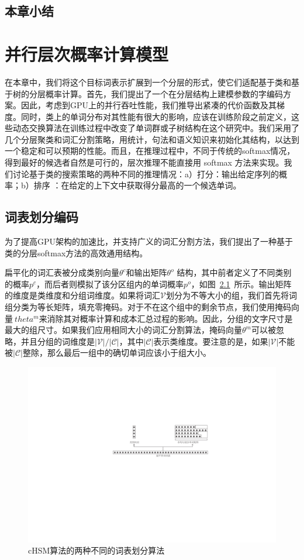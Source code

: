 \section{本章小结}

\chapter{并行层次概率计算模型}
在本章中，我们将这个目标词表示扩展到一个分层的形式，使它们适配基于类和基于树的分层概率计算。首先，我们提出了一个在分层结构上建模参数的字编码方案。因此，考虑到GPU上的并行吞吐性能，我们推导出紧凑的代价函数及其梯度。同时，类上的单词分布对其性能有很大的影响，应该在训练阶段之前定义，这些动态交换算法在训练过程中改变了单词群或子树结构在这个研究中。我们采用了几个分层聚类和词汇分割策略，用统计，句法和语义知识来初始化其结构，以达到一个稳定和可以预期的性能。而且，在推理过程中，不同于传统的softmax情况，得到最好的候选者自然是可行的，层次推理不能直接用 softmax 方法来实现。我们讨论基于类的搜索策略的两种不同的推理情况：a）打分：输出给定序列的概率；b）排序   ：在给定的上下文中获取得分最高的一个候选单词。
\section{词表划分编码}
为了提高GPU架构的加速比，并支持广义的词汇分割方法，我们提出了一种基于类的分层softmax方法的高效通用结构。

扁平化的词汇表被分成类别向量$ \theta^c $和输出矩阵$ \theta^o $ 结构，其中前者定义了不同类别的概率$ p ^ c $，而后者则模拟了该分区组内的单词概率$ p ^ o $，如图~\ref {fig:chsm}~所示。输出矩阵的维度是类维度和分组词维度。如果将词汇$ \mathcal {V} $划分为不等大小的组，我们首先将词组分类为等长矩阵，填充零掩码。对于不在这个组中的剩余节点，我们使用掩码向量$ \ theta ^ m $来消除其对概率计算和成本汇总过程的影响。因此，分组的文字尺寸是最大的组尺寸。如果我们应用相同大小的词汇分割算法，掩码向量$ \theta ^ m $可以被忽略，并且分组的词维度是$ \mathcal {| V | / | C |} $，其中$ \mathcal {| C |} $表示类维度。要注意的是，如果$ \mathcal {| V |} $不能被$ \mathcal {| C |} $整除，那么最后一组中的确切单词应该小于组大小。
\begin{figure}[!ht]
  \centering
\includegraphics[width=0.85\linewidth]{./figures/chsm-simple.pdf}
\caption{cHSM算法的两种不同的词表划分算法}\label{fig:chsm}
\end{figure}


